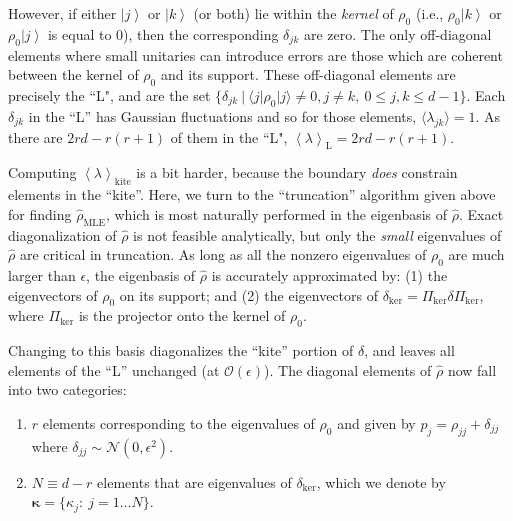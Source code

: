\documentclass[aps,pra, twocolumn]{revtex4}
\newcommand{\ket}[1]{\ensuremath{\left|#1\right\rangle}}
\newcommand{\expect}[1]{\ensuremath{\left\langle#1\right\rangle}}
\newcommand{\bvec}[1]{\boldsymbol{#1}}
\newcommand{\rhohat}{\hat{\rho}}
\newcommand{\rhoMLE}{\rhohat_{\scriptscriptstyle\mathrm{MLE}}}
\begin{document}
However, if either $\ket{j}$ or $\ket{k}$ (or both) lie within the \emph{kernel} of $\rho_{0}$ (i.e., $\rho_{0}\ket{k}$ or $\rho_{0}\ket{j}$ is equal to 0), then the corresponding $\delta_{jk}$ are zero. The only off-diagonal elements where small unitaries can introduce errors are those which are coherent between the kernel of $\rho_{0}$ and its support. These off-diagonal elements are precisely the ``L", and are  the set $\{\delta_{jk}~|~\langle j | \rho_{0}|j\rangle \neq 0, j\neq k, ~ 0 \leq j,k \leq d - 1\}$. Each $\delta_{jk}$ in the ``L'' has Gaussian fluctuations and so for those elements, $\langle \lambda_{jk} \rangle = 1$. As there are $2rd - r(r+1)$ of them in the ``L", $\expect{\lambda}_{\mathrm{L}} = 2rd - r(r+1)$.

Computing $\expect{\lambda}_{\mathrm{kite}}$ is a bit harder, because the boundary \emph{does} constrain elements in the ``kite''.  Here, we turn to the ``truncation'' algorithm given above for finding $\rhoMLE$, which is most naturally performed in the eigenbasis of $\hat\rho$.  Exact diagonalization of $\hat\rho$ is not feasible analytically, but only the \emph{small} eigenvalues of $\hat\rho$ are critical in truncation.  As long as all the nonzero eigenvalues of $\rho_0$ are much larger than $\epsilon$, the eigenbasis of $\hat\rho$ is accurately approximated by: (1) 
the eigenvectors of $\rho_0$ on its support; and (2) the eigenvectors of $\delta_{\mathrm{ker}} = \Pi_{\mathrm{ker}}\delta\Pi_{\mathrm{ker}}$, where $\Pi_{\mathrm{ker}}
$ is the projector onto the kernel of $\rho_0$.

Changing to this basis diagonalizes the ``kite'' portion of $\delta$, and leaves all elements of the ``L'' unchanged (at $\mathcal{O}(\epsilon)$).  The diagonal elements of $\hat\rho$ now fall into two categories:
\begin{enumerate}[noitemsep]
\item $r$ elements corresponding to the eigenvalues of $\rho_0$ and given by $p_{j} = \rho_{jj} + \delta_{jj}$ where $\delta_{jj} \sim 
\mathcal{N}(0,\epsilon^2)$.
\item $N \equiv d-r$ elements that are eigenvalues of $\delta_{\mathrm{ker}}$, which we denote by $\bvec{\kappa} = \{\kappa_j:~j = 1\ldots 
N\}$.
\end{enumerate}
\end{document}
